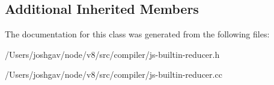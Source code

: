 \subsection*{Additional Inherited Members}


The documentation for this class was generated from the following files\+:\begin{DoxyCompactItemize}
\item 
/\+Users/joshgav/node/v8/src/compiler/js-\/builtin-\/reducer.\+h\item 
/\+Users/joshgav/node/v8/src/compiler/js-\/builtin-\/reducer.\+cc\end{DoxyCompactItemize}
